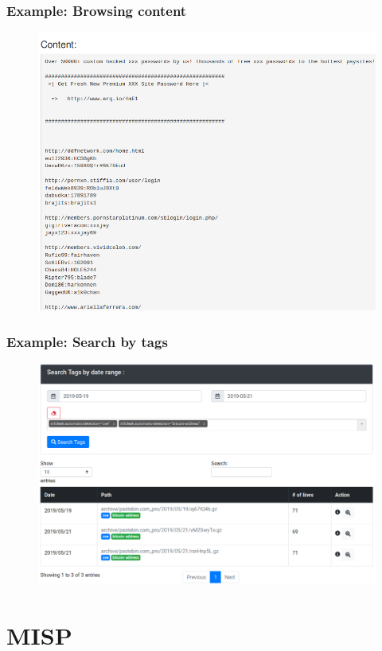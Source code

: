 \documentclass{beamer}
\begin{document}
\begin{frame}
    \frametitle{Example: Browsing content}
    \begin{figure}
        \includegraphics[scale=0.3, angle=0]{images/ail_06.png}
    \end{figure}
\end{frame}

\begin{frame}
    \frametitle{Example: Search by tags}
    \begin{figure}
        \includegraphics[scale=0.26, angle=0]{images/ail_14.png}
    \end{figure}
\end{frame}
\section{MISP}
\end{document}
